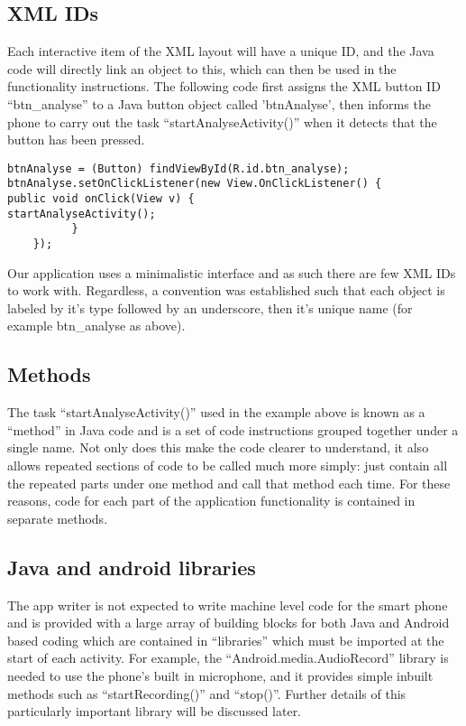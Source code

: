 \subsection{XML IDs}
Each interactive item of the XML layout will have a unique ID, and the Java code will directly link an object to this, which can then be used in the functionality instructions. The following code first assigns the XML button ID “btn\_analyse” to a Java button object called 'btnAnalyse', then informs the phone to carry out the task “startAnalyseActivity()” when it detects that the button has been pressed.
\begin{lstlisting}
btnAnalyse = (Button) findViewById(R.id.btn_analyse);
btnAnalyse.setOnClickListener(new View.OnClickListener() {
public void onClick(View v) {
startAnalyseActivity();
          }
    });
\end{lstlisting}
Our application uses a minimalistic interface and as such there are few XML IDs to work with. Regardless, a convention was established such that each object is labeled by it’s type followed by an underscore, then it’s unique name (for example btn\_analyse as above).
\subsection{Methods}
The task “startAnalyseActivity()” used in the example above is known as a “method” in Java code and is a set of code instructions grouped together under a single name. Not only does this make the code clearer to understand, it also allows repeated sections of code to be called much more simply: just contain all the repeated parts under one method and call that method each time. For these reasons, code for each part of the application functionality is contained in separate methods.
\subsection{Java and android libraries}
The app writer is not expected to write machine level code for the smart phone and is provided with a large array of building blocks for both Java and Android based coding which are contained in “libraries” which must be imported at the start of each activity. For example, the “Android.media.AudioRecord” library is needed to use the phone’s built in microphone, and it provides simple inbuilt methods such as “startRecording()” and “stop()”. Further details of this particularly important library will be discussed later.
